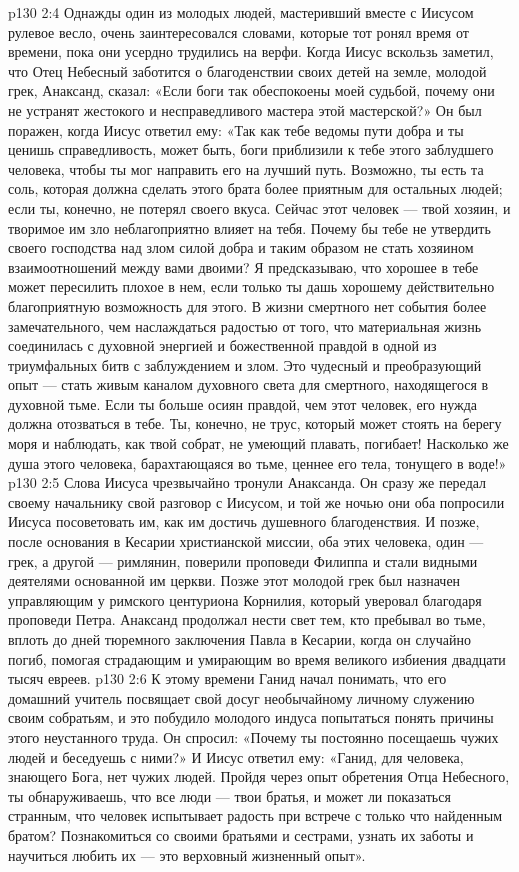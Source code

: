 \vs p130 2:4 \pc Однажды один из молодых людей, мастеривший вместе с Иисусом рулевое весло, очень заинтересовался словами, которые тот ронял время от времени, пока они усердно трудились на верфи. Когда Иисус вскользь заметил, что Отец Небесный заботится о благоденствии своих детей на земле, молодой грек, Анаксанд, сказал: «Если боги так обеспокоены моей судьбой, почему они не устранят жестокого и несправедливого мастера этой мастерской?» Он был поражен, когда Иисус ответил ему: «Так как тебе ведомы пути добра и ты ценишь справедливость, может быть, боги приблизили к тебе этого заблудшего человека, чтобы ты мог направить его на лучший путь. Возможно, ты есть та соль, которая должна сделать этого брата более приятным для остальных людей; если ты, конечно, не потерял своего вкуса. Сейчас этот человек --- твой хозяин, и творимое им зло неблагоприятно влияет на тебя. Почему бы тебе не утвердить своего господства над злом силой добра и таким образом не стать хозяином взаимоотношений между вами двоими? Я предсказываю, что хорошее в тебе может пересилить плохое в нем, если только ты дашь хорошему действительно благоприятную возможность для этого. В жизни смертного нет события более замечательного, чем наслаждаться радостью от того, что материальная жизнь соединилась с духовной энергией и божественной правдой в одной из триумфальных битв с заблуждением и злом. Это чудесный и преобразующий опыт --- стать живым каналом духовного света для смертного, находящегося в духовной тьме. Если ты больше осиян правдой, чем этот человек, его нужда должна отозваться в тебе. Ты, конечно, не трус, который может стоять на берегу моря и наблюдать, как твой собрат, не умеющий плавать, погибает! Насколько же душа этого человека, барахтающаяся во тьме, ценнее его тела, тонущего в воде!»
\vs p130 2:5 Слова Иисуса чрезвычайно тронули Анаксанда. Он сразу же передал своему начальнику свой разговор с Иисусом, и той же ночью они оба попросили Иисуса посоветовать им, как им достичь душевного благоденствия. И позже, после основания в Кесарии христианской миссии, оба этих человека, один --- грек, а другой --- римлянин, поверили проповеди Филиппа и стали видными деятелями основанной им церкви. Позже этот молодой грек был назначен управляющим у римского центуриона Корнилия, который уверовал благодаря проповеди Петра. Анаксанд продолжал нести свет тем, кто пребывал во тьме, вплоть до дней тюремного заключения Павла в Кесарии, когда он случайно погиб, помогая страдающим и умирающим во время великого избиения двадцати тысяч евреев.
\vs p130 2:6 \pc К этому времени Ганид начал понимать, что его домашний учитель посвящает свой досуг необычайному личному служению своим собратьям, и это побудило молодого индуса попытаться понять причины этого неустанного труда. Он спросил: «Почему ты постоянно посещаешь чужих людей и беседуешь с ними?» И Иисус ответил ему: «Ганид, для человека, знающего Бога, нет чужих людей. Пройдя через опыт обретения Отца Небесного, ты обнаруживаешь, что все люди --- твои братья, и может ли показаться странным, что человек испытывает радость при встрече с только что найденным братом? Познакомиться со своими братьями и сестрами, узнать их заботы и научиться любить их --- это верховный жизненный опыт».
